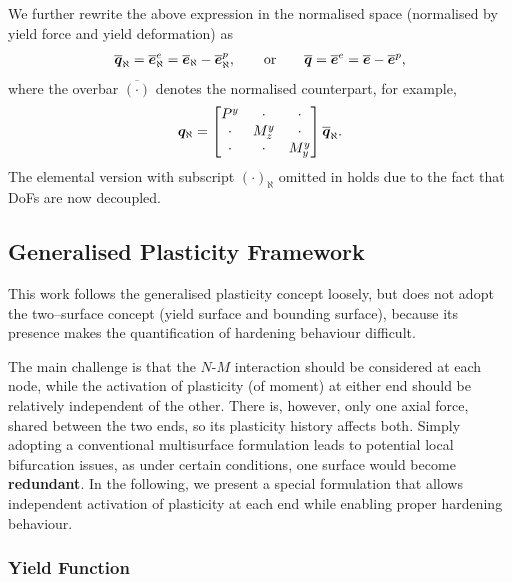 We further rewrite the above expression in the normalised space (normalised by yield force and yield deformation) as
\begin{gather}\label{eq:new_kin}
\bm{\overline{q}}_\aleph=\overline{\bm{e}}_\aleph^e=\overline{\bm{e}}_\aleph-\overline{\bm{e}}_\aleph^p,\qquad\text{or}\qquad
\bm{\overline{q}}=\overline{\bm{e}}^e=\overline{\bm{e}}-\overline{\bm{e}}^p,
\end{gather}
where the overbar $\overline{\left(\cdot\right)}$ denotes the normalised counterpart, for example,
\begin{gather}\label{eq:nm_normalisedq}
\bm{q}_\aleph=\begin{bmatrix}
P^y&\cdot&\cdot\\\cdot&M_z^y&\cdot\\\cdot&\cdot&M_y^y
\end{bmatrix}\bm{\overline{q}}_\aleph.
\end{gather}
The elemental version with subscript $\left(\cdot\right)_\aleph$ omitted in  holds due to the fact that DoFs are now decoupled.
\subsection{Generalised Plasticity Framework}
This work follows the generalised plasticity concept \cite{Auricchio1994} loosely, but does not adopt the two--surface concept (yield surface and bounding surface), because its presence makes the quantification of hardening behaviour difficult.

The main challenge is that the $N$-$M$ interaction should be considered at each node, while the activation of plasticity (of moment) at either end should be relatively independent of the other.
There is, however, only one axial force, shared between the two ends, so its plasticity history affects both.
Simply adopting a conventional multisurface formulation \cite{Simo1998} leads to potential local bifurcation issues, as under certain conditions, one surface would become \textbf{redundant}.
In the following, we present a special formulation that allows independent activation of plasticity at each end while enabling proper hardening behaviour.
\subsubsection{Yield Function}

